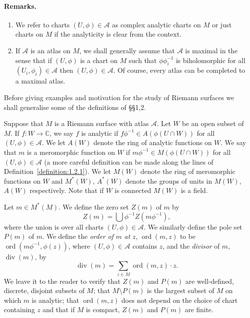 \paragraph*{Remarks.}
\begin{enumerate}
\item We refer to charts $(U,\phi)\in\mathcal A$ as complex analytic charts on $M$ or just charts on $M$ if the analyticity is clear from the context.
\item If $\mathcal A$ is an atlas on $M$, we shall generally assume that $\mathcal A$ is maximal in the sense that if $(U,\phi)$ is a chart on $M$ such that $\phi\phi_i^{-1}$ is biholomorphic for all $(U_i,\phi_i)\in\mathcal A$ then $(U,\phi)\in\mathcal A$. Of course, every atlas can be completed to a maximal atlas.
\end{enumerate}
Before giving examples and motivation for the study of Riemann surfaces we shall generalise some of the definitions of \S\S1,2.

Suppose that $M$ is a Riemann surface with atlas $\mathcal A$. Let $W$ be an open subset of $M$. If $f:W\to\mathbb C$, we say $f$ is analytic if $f\phi^{-1}\in A(\phi(U\cap W))$ for all $(U,\phi)\in\mathcal A$. We let $A(W)$ denote the ring of analytic functions on $W$. We say that $m$ is a meromorphic function on $W$ if $m\phi^{-1}\in M(\phi(U\cap W))$ for all $(U,\phi)\in\mathcal A$ (a more careful definition can be made along the lines of Definition~\ref{definition:1.2.1}). We let $M(W)$ denote the ring of meromorphic functions on $W$ and $M^*(W)$, $A^*(W)$ denote the groups of units in $M(W)$, $A(W)$ respectively. Note that if $W$ is connected $M(W)$ is a field.

Let $m\in M^*(M)$. We define the zero set $Z(m)$ of $m$ by
\[ Z(m)=\bigcup\phi^{-1}Z(m\phi^{-1}), \]
where the union is over all charts $(U,\phi)\in\mathcal A$. We similarly define the pole set $P(m)$ of $m$. We define the \emph{order of $m$ at $z$}, $\operatorname{ord}(m,z)$ to be $\operatorname{ord}(m\phi^{-1},\phi(z))$, where $(U,\phi)\in\mathcal A$ contains $z$, and the \emph{divisor} of $m$, $\operatorname{div}(m)$, by
\[ \operatorname{div}(m)=\sum_{z\in M}\operatorname{ord}(m,z)\cdot z. \]
We leave it to the reader to verify that $Z(m)$ and $P(m)$ are well-defined, discrete, disjoint subsets of $M$; that $M\setminus P(m)$ is the largest subset of $M$ on which $m$ is analytic; that $\operatorname{ord}(m,z)$ does not depend on the choice of chart containing $z$ and that if $M$ is compact, $Z(m)$ and $P(m)$ are finite.

